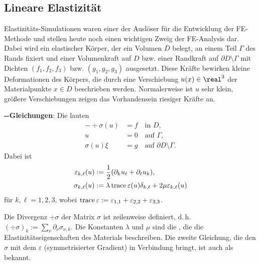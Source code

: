 \pagebreak

\subsection{%
    Lineare Elastizität%
}

Elastizitäts-Simulationen waren einer der Auslöser für die Entwicklung der FE-Methode und
stellen heute noch einen wichtigen Zweig der FE-Analysis dar.
Dabei wird ein elastischer Körper, der ein Volumen $\overline{D}$ belegt,
an einem Teil $\Gamma$ des Rands fixiert und einer Volumenkraft auf $D$ bzw. einer
Randkraft auf $\partial D \setminus \Gamma$ mit Dichten $(f_1, f_2, f_3)$ bzw.
$(g_1, g_2, g_3)$ ausgesetzt.
Diese Kräfte bewirken kleine Deformationen des Körpers, die durch eine Verschiebung
$u(x) \in \real^3$ der Materialpunkte $x \in D$ beschrieben werden.
Normalerweise ist $u$ sehr klein,
größere Verschiebungen zeigen das Vorhandensein riesiger Kräfte an.

\textbf{--Gleichungen}:
Die  lauten
\begin{align*}
    -\div \sigma(u) &= f \quad\text{in }D,\\
    u &= 0 \quad\text{auf } \Gamma,\\
    \sigma(u) \xi &= g \quad\text{auf } \partial D \setminus \Gamma.
\end{align*}
Dabei ist
\begin{align*}
    \varepsilon_{k,\ell}(u) &:= \frac{1}{2} (\partial_k u_\ell + \partial_\ell u_k),\\
    \sigma_{k,\ell}(u) &:= \lambda \operatorname{trace} \varepsilon(u) \delta_{k,\ell} +
    2\mu \varepsilon_{k,\ell}(u)
\end{align*}
für $k, \ell = 1, 2, 3$, wobei
$\operatorname{trace} \varepsilon := \varepsilon_{1,1} + \varepsilon_{2,2} + \varepsilon_{3,3}$.

Die Divergenz $\div \sigma$ der Matrix $\sigma$ ist zeilenweise definiert, d.\,h.
$(\div \sigma)_k := \sum_\nu \partial_\nu \sigma_{\nu,k}$.
Die Konstanten $\lambda$ und $\mu$ sind die ,
die die Elastizitätseigenschaften des Materials beschreiben.
Die zweite Gleichung, die den  $\sigma$ mit dem
 $\varepsilon$ (symmetrisierter Gradient)
in Verbindung bringt, ist auch als
 bekannt.

\linie

